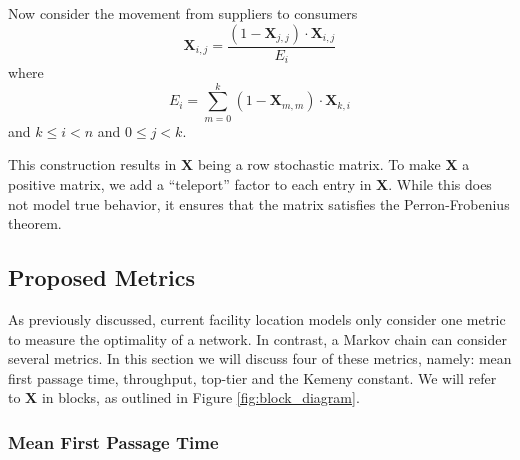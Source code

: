 \documentclass[twoside,twocolumn]{article}
\begin{document}

Now consider the movement from suppliers to consumers
$$\textbf{X}_{i, j} = \frac{(1 - \textbf{X}_{j, j})\cdot \textbf{X}_{i, j}}{E_i}$$
where 
$$E_i = \sum_{m=0}^{k} (1 - \textbf{X}_{m,m})\cdot \textbf{X}_{k, i}$$
and $k \leq i < n$ and $0 \leq j < k$.

This construction results in $\textbf{X}$ being a row stochastic matrix.
To make $\textbf{X}$ a positive matrix, we add a ``teleport'' factor to each entry in $\textbf{X}$.
While this does not model true behavior, it ensures that the matrix satisfies the Perron-Frobenius theorem.


\subsection{Proposed Metrics}
\label{sec:proposed_metrics}

As previously discussed, current facility location models only consider one metric to measure the optimality of a network.
In contrast, a Markov chain can consider several metrics.
In this section we will discuss four of these metrics, namely: mean first passage time, throughput, top-tier and the Kemeny constant.
We will refer to $\textbf{X}$ in blocks, as outlined in Figure \ref{fig:block_diagram}.

\subsubsection{Mean First Passage Time}
\end{document}
